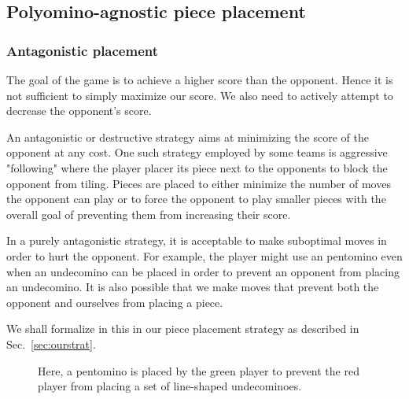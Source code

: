 \documentclass{scrartcl}
\begin{document}
\subsection{Polyomino-agnostic piece placement}\label{sec:agnostic}

\subsubsection{Antagonistic placement} %
The goal of the game is to achieve a higher score than the opponent. Hence it is not sufficient to simply maximize our score. We also need to actively attempt to decrease the opponent's score.

An antagonistic or destructive strategy aims at minimizing the score of the opponent at any cost. One such strategy employed by some teams is aggressive "following" where the player placer its piece next to the opponents to block the opponent from tiling. Pieces are placed to either minimize the number of moves the opponent can play or to force the opponent to play smaller pieces with the overall goal of preventing them from increasing their score.

In a purely antagonistic strategy, it is acceptable to make suboptimal moves in order to hurt the opponent. For example, the player might use an pentomino even when an undecomino can be placed in order to prevent an opponent from placing an undecomino. It is also possible that we make moves that prevent both the opponent and ourselves from placing a piece.

We shall formalize in this in our piece placement strategy as described in Sec.~\ref{sec:ourstrat}.

\begin{figure}[h]
\centering
{}
\caption{Here, a pentomino is placed by the green player to prevent the red player from placing a set of line-shaped undecominoes.}\label{fig:antagonistic_placement}
\end{figure}
\end{document}
